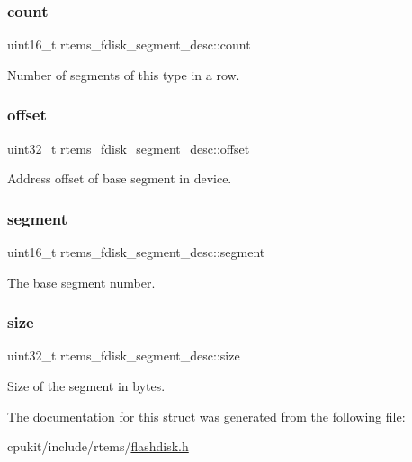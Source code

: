 \subsubsection{\texorpdfstring{count}{count}}
{\footnotesize\ttfamily uint16\+\_\+t rtems\+\_\+fdisk\+\_\+segment\+\_\+desc\+::count}

Number of segments of this type in a row. \mbox{\label{structrtems__fdisk__segment__desc_ac7c616a6fc4a48edb952ef57078b89bb}} 
\subsubsection{\texorpdfstring{offset}{offset}}
{\footnotesize\ttfamily uint32\+\_\+t rtems\+\_\+fdisk\+\_\+segment\+\_\+desc\+::offset}

Address offset of base segment in device. \mbox{\label{structrtems__fdisk__segment__desc_a69898a46cb1e7b34ab1e11a53e352034}} 
\subsubsection{\texorpdfstring{segment}{segment}}
{\footnotesize\ttfamily uint16\+\_\+t rtems\+\_\+fdisk\+\_\+segment\+\_\+desc\+::segment}

The base segment number. \mbox{\label{structrtems__fdisk__segment__desc_a04cde2011f4a662442909341c4768e47}} 
\subsubsection{\texorpdfstring{size}{size}}
{\footnotesize\ttfamily uint32\+\_\+t rtems\+\_\+fdisk\+\_\+segment\+\_\+desc\+::size}

Size of the segment in bytes. 

The documentation for this struct was generated from the following file\+:\begin{DoxyCompactItemize}
\item 
cpukit/include/rtems/\mbox{\hyperlink{flashdisk_8h}{flashdisk.\+h}}\end{DoxyCompactItemize}
